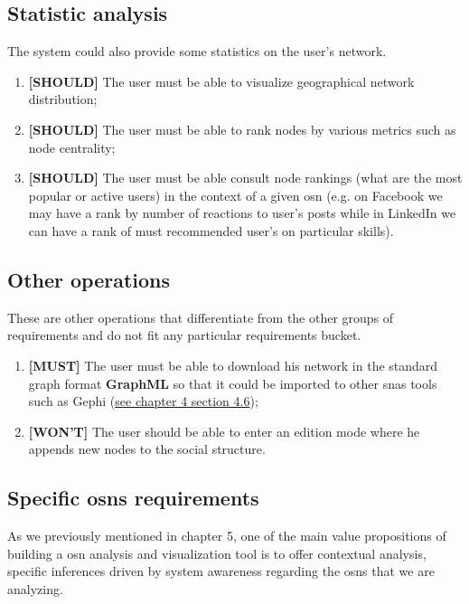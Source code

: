 \subsection{Statistic analysis}

The system could also provide some statistics on the user's network.

\begin{enumerate}
    \item \textbf{[SHOULD]} The user must be able to visualize geographical network distribution;
    \item \textbf{[SHOULD]} The user must be able to rank nodes by various metrics such as node centrality;
    \item \textbf{[SHOULD]} The user must be able consult node rankings (what are the most popular or active users) in the context of a given \gls{osn} (e.g. on Facebook we may have a rank by number of reactions to user's posts while in LinkedIn we can have a rank of must recommended user's on particular skills).
\end{enumerate}

\subsection{Other operations}

These are other operations that differentiate from the other groups of requirements and do not fit any particular requirements bucket.

\begin{enumerate}
    \item \textbf{[MUST]} The user must be able to download his network in the standard graph format \textbf{GraphML} \citep{brandes2001graphml} so that it could be imported to other \glspl{sna} tools such as Gephi (\hyperref[sec:snas]{see chapter 4 section 4.6});
    \item \textbf{[WON'T]} The user should be able to enter an edition mode where he appends new nodes to the social structure.
\end{enumerate}


\subsection{Specific \glspl{osn} requirements}

As we previously mentioned in chapter 5, one of the main value propositions of building a \gls{osn} analysis and visualization tool is to offer contextual analysis, specific inferences driven by system awareness regarding the \glspl{osn} that we are analyzing.

